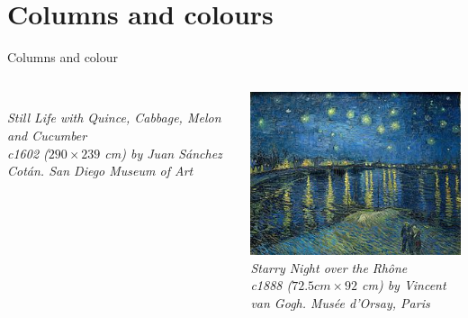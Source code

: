 \documentclass[12pt, aspectratio=169, xcolor=pdftex]{beamer}
\begin{document}
\section{Columns and colours}
\begin{frame}{Columns and colour}
\centering{\huge{\color{BlueGreen}{Two compositions with conic sections}}}
\begin{columns}
  \begin{column}[T]{0.5\textwidth}
  \\ %
       \tiny{\emph{Still Life with Quince, Cabbage, Melon and Cucumber\\ c1602 ($290 \times 239$ cm)
    by Juan S\'anchez Cot\'an.  San Diego Museum of Art}} %

  \end{column}
  \begin{column}[T]{0.5\textwidth}
       \includegraphics[scale=0.35]{Starry_Night_Over_the_Rhone.jpg}\\
       \tiny{\emph{Starry Night over the Rh\^one\\
       c1888 ($72.5 cm \times 92$ cm) by Vincent van Gogh. Mus\'ee d\rq Orsay, Paris}}
   \end{column}
 \end{columns}
\end{frame}
\end{document}
